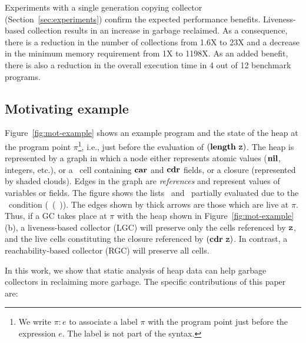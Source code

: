 \documentclass[9pt,nonatbib]{sigplanconf}
\begin{document}
Experiments    with   a    single    generation   copying    collector
(Section~\ref{sec:experiments})   confirm  the   expected  performance
benefits.  Liveness-based collection results in an increase in garbage
reclaimed.  As  a consequence, there is  a reduction in the  number of
collections from 1.6X  to 23X and a decrease  in the minimum
memory requirement from  1X to 1198X.  As  an added benefit,
there is also a reduction in the overall execution time in 4 out of 12
benchmark programs.
 

\subsection{Motivating example}
\label{sec:motiv}
   
Figure~\ref{fig:mot-example}   shows  an   example
program and the state of the heap at the program point $\pi$\footnote{We write
$\pi\!:\!e$ to  associate a  label $\pi$ with  the program  point just
before  the  expression  $e$. The label is not part of the syntax.},  i.e., just  before  the  evaluation  of
$(\mathbf{length}\ \mbox{\tt z})$.  The heap is represented  by a graph in which a node
either  represents  atomic  values   ($\mbox{$\mathbf{ nil}$}$,  integers,  etc.),  or  a
\CONS\  cell  containing  $\mbox{$\mathbf{car}$}$  and  $\mbox{$\mathbf{cdr}$}$  fields,  or  a  closure
(represented  by  shaded  clouds).   Edges   in  the  graph  are  {\em
  references} and represent values of variables or fields.  The figure
shows the  lists \px\  and \pz\  partially evaluated  due to  the
\SIF\ condition 
(\NULLQ~(\CAR~\pz)).
The edges  shown by thick  arrows are those  which are live  at $\pi$.
Thus, if a GC takes  place at $\pi$ with the heap shown
in Figure~\ref{fig:mot-example}(b),  a liveness-based  collector (LGC)
will preserve only  the cells referenced by $\mbox{\tt z}$, and  the live cells
constituting the  closure referenced by $(\mbox{$\mathbf{cdr}$}~\mbox{\tt z})$.   In contrast, a
reachability-based collector (RGC) will preserve all cells.

In  this work,  we show  that  static analysis  of heap  data can  help
garbage  collectors   in  reclaiming   more  garbage.    The  specific
contributions of this paper are:
\end{document}
